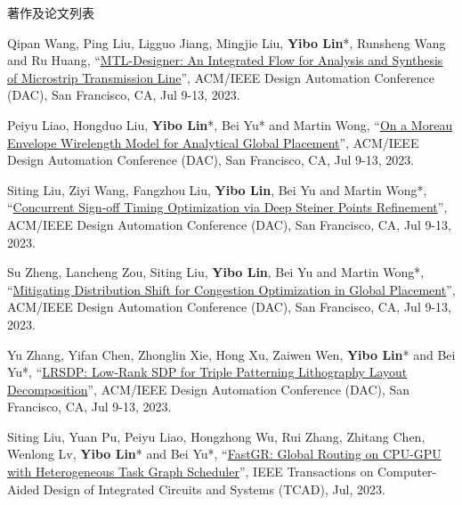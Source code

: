 \begin{rSection}{著作及论文列表}
\begin{description}[font=\normalfont, rightmargin=2em]
{}
            

\item[{[C121]}]{
        Qipan Wang, Ping Liu, Ligguo Jiang, Mingjie Liu, \textbf{Yibo Lin}*, Runsheng Wang and Ru Huang, 
    ``\href{https://doi.org/10.1109/DAC56929.2023.10247759}{MTL-Designer: An Integrated Flow for Analysis and Synthesis of Microstrip Transmission Line}'', 
    ACM/IEEE Design Automation Conference (DAC), San Francisco, CA, Jul 9-13, 2023.
    
}
            

\item[{[C120]}]{
        Peiyu Liao, Hongduo Liu, \textbf{Yibo Lin}*, Bei Yu* and Martin Wong, 
    ``\href{https://doi.org/10.1109/DAC56929.2023.10247712}{On a Moreau Envelope Wirelength Model for Analytical Global Placement}'', 
    ACM/IEEE Design Automation Conference (DAC), San Francisco, CA, Jul 9-13, 2023.
    
}
            

\item[{[C119]}]{
        Siting Liu, Ziyi Wang, Fangzhou Liu, \textbf{Yibo Lin}, Bei Yu and Martin Wong*, 
    ``\href{https://doi.org/10.1109/DAC56929.2023.10247794}{Concurrent Sign-off Timing Optimization via Deep Steiner Points Refinement}'', 
    ACM/IEEE Design Automation Conference (DAC), San Francisco, CA, Jul 9-13, 2023.
    
}
            

\item[{[C118]}]{
        Su Zheng, Lancheng Zou, Siting Liu, \textbf{Yibo Lin}, Bei Yu and Martin Wong*, 
    ``\href{https://doi.org/10.1109/DAC56929.2023.10247660}{Mitigating Distribution Shift for Congestion Optimization in Global Placement}'', 
    ACM/IEEE Design Automation Conference (DAC), San Francisco, CA, Jul 9-13, 2023.
    
}
            

\item[{[C117]}]{
        Yu Zhang, Yifan Chen, Zhonglin Xie, Hong Xu, Zaiwen Wen, \textbf{Yibo Lin}* and Bei Yu*, 
    ``\href{https://doi.org/10.1109/DAC56929.2023.10247846}{LRSDP: Low-Rank SDP for Triple Patterning Lithography Layout Decomposition}'', 
    ACM/IEEE Design Automation Conference (DAC), San Francisco, CA, Jul 9-13, 2023.
    
}
            

\item[{[J116]}]{
        Siting Liu, Yuan Pu, Peiyu Liao, Hongzhong Wu, Rui Zhang, Zhitang Chen, Wenlong Lv, \textbf{Yibo Lin}* and Bei Yu*, 
    ``\href{https://doi.org/10.1109/TCAD.2022.3217668}{FastGR: Global Routing on CPU-GPU with Heterogeneous Task Graph Scheduler}'', 
    IEEE Transactions on Computer-Aided Design of Integrated Circuits and Systems (TCAD), Jul, 2023.
    
}
\end{description}
\end{rSection}
